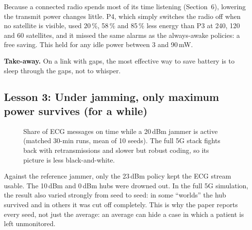 \documentclass[11pt,a4paper]{article}
\newcommand{\insight}[1]{\begin{idea}\textsf{\textbf{\color{amber!80!black}Take-away.}} #1\end{idea}}
\begin{document}
Because a connected radio spends most of its time listening (Section~6), lowering the transmit power changes little. P4, which simply switches the radio off when no satellite is visible, used 20\,\%, 58\,\% and 85\,\% less energy than P3 at 240, 120 and 60 satellites, and it missed the same alarms as the always-awake policies: a free saving. This held for any idle power between 3 and 90\,mW.

\insight{On a link with gaps, the most effective way to save battery is to sleep through the gaps, not to whisper.}

\subsection{Lesson 3: Under jamming, only maximum power survives (for a while)}

\begin{figure}[h]
\centering
{}
\caption{Share of ECG messages on time while a 20\,dBm jammer is active (matched 30-min runs, mean of 10 seeds). The full 5G stack fights back with retransmissions and slower but robust coding, so its picture is less black-and-white.}\label{fig:jam}
\end{figure}

Against the reference jammer, only the 23\,dBm policy kept the ECG stream usable. The 10\,dBm and 0\,dBm hubs were drowned out. In the full 5G simulation, the result also varied strongly from seed to seed: in some ``worlds'' the hub survived and in others it was cut off completely. This is why the paper reports every seed, not just the average: an average can hide a case in which a patient is left unmonitored.
\end{document}
